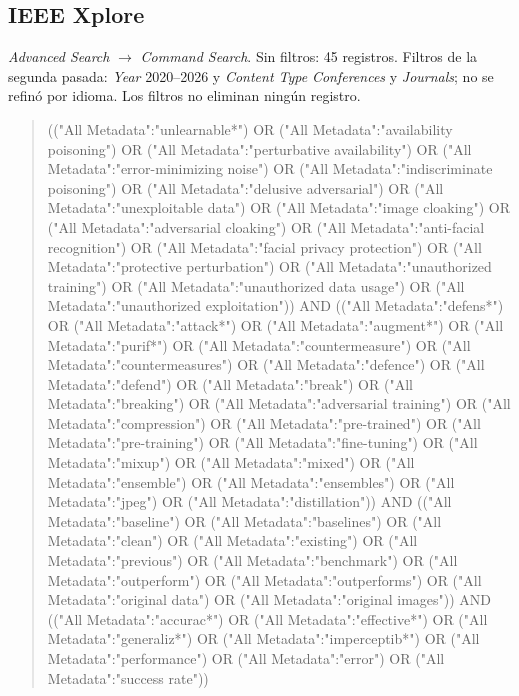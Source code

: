 \documentclass[pdflatex,sn-mathphys-num]{sn-jnl}
\theoremstyle{thmstyleone}
\theoremstyle{thmstyletwo}
\theoremstyle{thmstylethree}
\begin{document}
\begin{appendices}
\subsection{IEEE Xplore}
\emph{Advanced Search} $\rightarrow$ \emph{Command Search}. Sin filtros: 45 registros. Filtros de la segunda pasada: \emph{Year} 2020--2026 y \emph{Content Type} \emph{Conferences} y \emph{Journals}; no se refinó por idioma. Los filtros no eliminan ningún registro.
\begin{quote}\footnotesize\ttfamily\raggedright
(("All Metadata":"unlearnable*") OR \allowbreak ("All Metadata":"availability poisoning") OR \allowbreak ("All Metadata":"perturbative availability") OR \allowbreak ("All Metadata":"error-minimizing noise") OR \allowbreak ("All Metadata":"indiscriminate poisoning") OR \allowbreak ("All Metadata":"delusive adversarial") OR \allowbreak ("All Metadata":"unexploitable data") OR \allowbreak ("All Metadata":"image cloaking") OR \allowbreak ("All Metadata":"adversarial cloaking") OR \allowbreak ("All Metadata":"anti-facial recognition") OR \allowbreak ("All Metadata":"facial privacy protection") OR \allowbreak ("All Metadata":"protective perturbation") OR \allowbreak ("All Metadata":"unauthorized training") OR \allowbreak ("All Metadata":"unauthorized data usage") OR \allowbreak ("All Metadata":"unauthorized exploitation")) AND \allowbreak (("All Metadata":"defens*") OR \allowbreak ("All Metadata":"attack*") OR \allowbreak ("All Metadata":"augment*") OR \allowbreak ("All Metadata":"purif*") OR \allowbreak ("All Metadata":"countermeasure") OR \allowbreak ("All Metadata":"countermeasures") OR \allowbreak ("All Metadata":"defence") OR \allowbreak ("All Metadata":"defend") OR \allowbreak ("All Metadata":"break") OR \allowbreak ("All Metadata":"breaking") OR \allowbreak ("All Metadata":"adversarial training") OR \allowbreak ("All Metadata":"compression") OR \allowbreak ("All Metadata":"pre-trained") OR \allowbreak ("All Metadata":"pre-training") OR \allowbreak ("All Metadata":"fine-tuning") OR \allowbreak ("All Metadata":"mixup") OR \allowbreak ("All Metadata":"mixed") OR \allowbreak ("All Metadata":"ensemble") OR \allowbreak ("All Metadata":"ensembles") OR \allowbreak ("All Metadata":"jpeg") OR \allowbreak ("All Metadata":"distillation")) AND \allowbreak (("All Metadata":"baseline") OR \allowbreak ("All Metadata":"baselines") OR \allowbreak ("All Metadata":"clean") OR \allowbreak ("All Metadata":"existing") OR \allowbreak ("All Metadata":"previous") OR \allowbreak ("All Metadata":"benchmark") OR \allowbreak ("All Metadata":"outperform") OR \allowbreak ("All Metadata":"outperforms") OR \allowbreak ("All Metadata":"original data") OR \allowbreak ("All Metadata":"original images")) AND \allowbreak (("All Metadata":"accurac*") OR \allowbreak ("All Metadata":"effective*") OR \allowbreak ("All Metadata":"generaliz*") OR \allowbreak ("All Metadata":"imperceptib*") OR \allowbreak ("All Metadata":"performance") OR \allowbreak ("All Metadata":"error") OR \allowbreak ("All Metadata":"success rate"))

\end{quote}
\end{appendices}
\end{document}
